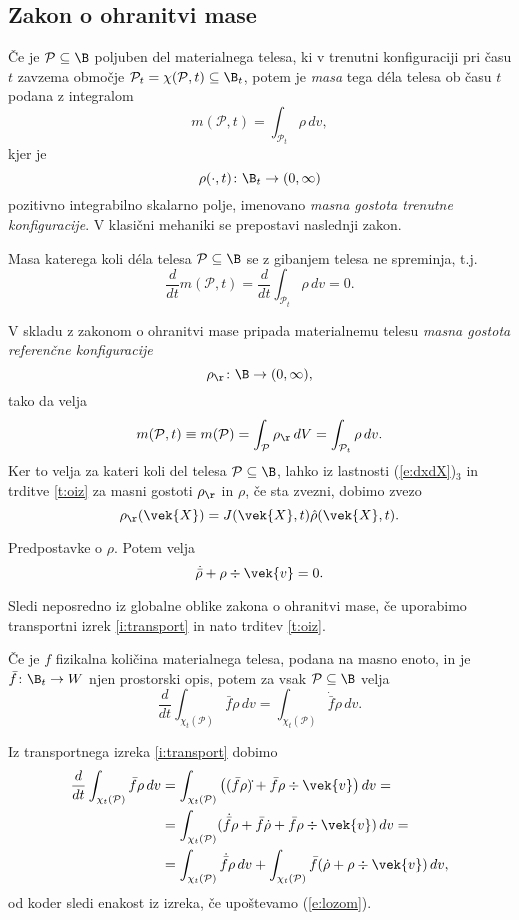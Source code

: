\subsection{Zakon o ohranitvi mase}


Če je $\mathcal{P}\subseteq\B$ poljuben del materialnega telesa, ki v trenutni konfiguraciji pri času $t$
zavzema območje $\mathcal{P}_t=\chi(\mathcal{P},t)\subseteq\B_t$, potem je \emph{masa} tega déla telesa
ob času $t$ podana z integralom
\[ m(\mathcal{P},t)=\int_{\mathcal{P}_t}\rho\,dv, \]
kjer je
\[ \rho(\cdot,t)\colon\B_t\to(0,\infty) \]
pozitivno integrabilno skalarno polje, imenovano
\emph{masna gostota trenutne konfiguracije}. V klasični mehaniki se prepostavi naslednji zakon.
\begin{aksiom}
	Masa katerega koli déla telesa $\mathcal{P}\subseteq\B$ se z gibanjem telesa ne spreminja, t.j.
	\[ \frac{d}{dt}m(\mathcal{P},t)=\frac{d}{dt}\int_{\mathcal{P}_t}\rho\,dv=0. \]
\end{aksiom}
V skladu z zakonom o ohranitvi mase pripada materialnemu telesu \emph{masna gostota referenčne konfiguracije}
\[ \rho_{\r}\colon\B\to(0,\infty), \]
tako da velja
\[ m(\mathcal{P},t)\equiv m(\mathcal{P})=\int_{\mathcal{P}}\rho_{\r}\,dV=\int_{\mathcal{P}_t}\rho\,dv. \]
Ker to velja za kateri koli del telesa $\mathcal{P}\subseteq\B$, lahko iz lastnosti (\ref{e:dxdX})${}_3$ in trditve \ref{t:oiz}
za masni gostoti $\rho_{\r}$ in $\rho$, če sta zvezni, dobimo zvezo
\[ \rho_{\r}(\vek{X})=J(\vek{X},t)\hat{\rho}(\vek{X},t). \]

\begin{izrek}
	\textcolor[rgb]{1,0,0}{Predpostavke o $\rho$.} Potem velja
	\begin{equation} \label{e:lozom} \dot{\bar{\rho}}+\rho\div\vek{v}=0. \end{equation}
\end{izrek}
\proof
	Sledi neposredno iz globalne oblike zakona o ohranitvi mase, če uporabimo transportni izrek \ref{i:transport}
	in nato trditev \ref{t:oiz}.
\endproof

\begin{izrek}
	Če je $f$ fizikalna količina materialnega telesa, podana na masno enoto, in je $\bar{f}\colon\B_t\to W$ njen
	prostorski opis, potem za vsak $\mathcal{P}\subseteq\B$ velja
	\[ \frac{d}{dt}\int_{\chi_t(\mathcal{P})}\bar{f}\rho\,dv=\int_{\chi_t(\mathcal{P})}\dot{\bar{f}}\rho\,dv. \]
\end{izrek}
\proof
	Iz transportnega izreka \ref{i:transport} dobimo
	\begin{align*}
		\frac{d}{dt}\int_{\chi_t(\mathcal{P})}\bar{f}\rho\,dv
		&= \int_{\chi_t(\mathcal{P})}\big((\bar{f}\rho)\dot{}+\bar{f}\rho\div\vek{v}\big)\,dv= \\
		&= \int_{\chi_t(\mathcal{P})}(\dot{\bar{f}}\rho+\bar{f}\dot{\rho}+\bar{f}\rho\div\vek{v})\,dv=\\
		&= \int_{\chi_t(\mathcal{P})}\dot{\bar{f}}\rho\,dv+
		\int_{\chi_t(\mathcal{P})}\bar{f}(\dot{\rho}+\rho\div\vek{v})\,dv,
	\end{align*}
	od koder sledi enakost iz izreka, če upoštevamo (\ref{e:lozom}).
\endproof
